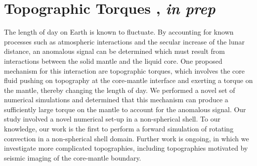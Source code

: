 \documentclass[12pt]{article}
\begin{document}
\section*{Topographic Torques \cite{tO25}, \textit{in prep}}
The length of day on Earth is known to fluctuate. By accounting for known processes such as atmospheric interactions and the secular increase of the lunar distance, an anomalous signal can be determined which must result from interactions between the solid mantle and the liquid core. One proposed mechanism for this interaction are topographic torques, which involves the core fluid pushing on topography at the core-mantle interface and exerting a torque on the mantle, thereby changing the length of day. We performed a novel set of numerical simulations and determined that this mechanism can produce a sufficiently large torque on the mantle to account for the anomalous signal. Our study involved a novel numerical set-up in a non-spherical shell. To our knowledge, our work is the first to perform a forward simulation of rotating convection in a non-spherical shell domain. Further work is ongoing, in which we investigate more complicated topographies, including topographies motivated by seismic imaging of the core-mantle boundary.
\printbibliography
\end{document}
